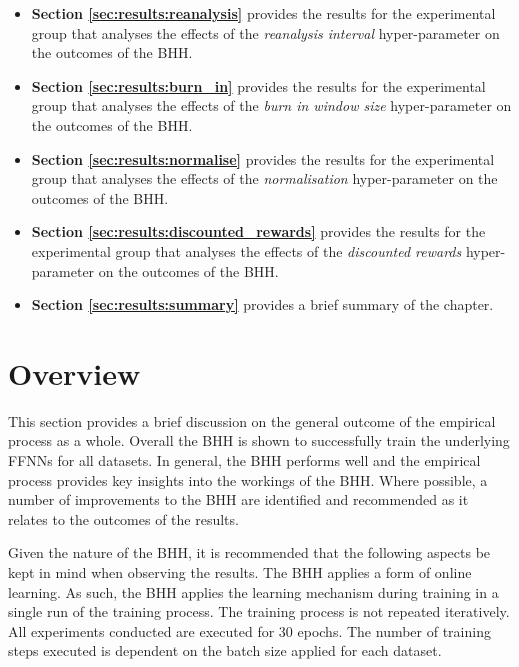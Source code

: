 \begin{itemize}
      \item \textbf{Section \ref{sec:results:reanalysis}} provides the results for the experimental group that analyses the effects of the \textit{reanalysis interval} hyper-parameter on the outcomes of the \acs{BHH}.

      \item \textbf{Section \ref{sec:results:burn_in}} provides the results for the experimental group that analyses the effects of the \textit{burn in window size} hyper-parameter on the outcomes of the \acs{BHH}.

      \item \textbf{Section \ref{sec:results:normalise}} provides the results for the experimental group that analyses the effects of the \textit{normalisation} hyper-parameter on the outcomes of the \acs{BHH}.

      \item \textbf{Section \ref{sec:results:discounted_rewards}} provides the results for the experimental group that analyses the effects of the \textit{discounted rewards} hyper-parameter on the outcomes of the \acs{BHH}.

      \item \textbf{Section \ref{sec:results:summary}} provides a brief summary of the chapter.
\end{itemize}

\section{Overview}\label{sec:results:overview}

This section provides a brief discussion on the general outcome of the empirical process as a whole. Overall the \acs{BHH} is shown to successfully train the underlying \acp{FFNN} for all datasets. In general, the \acs{BHH} performs well and the empirical process provides key insights into the workings of the \acs{BHH}. Where possible, a number of improvements to the \acs{BHH} are identified and recommended as it relates to the outcomes of the results.

Given the nature of the \acs{BHH}, it is recommended that the following aspects be kept in mind when observing the results. The \acs{BHH} applies a form of online learning. As such, the \acs{BHH} applies the learning mechanism during training in a single run of the training process. The training process is not repeated iteratively. All experiments conducted are executed for 30 epochs. The number of training steps executed is dependent on the batch size applied for each dataset.

